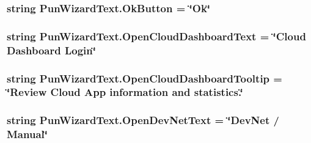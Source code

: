 \subsubsection[{\texorpdfstring{Ok\+Button}{OkButton}}]{\setlength{\rightskip}{0pt plus 5cm}string Pun\+Wizard\+Text.\+Ok\+Button = \char`\"{}Ok\char`\"{}}\hypertarget{class_pun_wizard_text_af648bd493d80786ad6e80e1761197482}{}\label{class_pun_wizard_text_af648bd493d80786ad6e80e1761197482}
\subsubsection[{\texorpdfstring{Open\+Cloud\+Dashboard\+Text}{OpenCloudDashboardText}}]{\setlength{\rightskip}{0pt plus 5cm}string Pun\+Wizard\+Text.\+Open\+Cloud\+Dashboard\+Text = \char`\"{}Cloud Dashboard Login\char`\"{}}\hypertarget{class_pun_wizard_text_a2c646651f0fc0c7f67b446c3c1c4e3d7}{}\label{class_pun_wizard_text_a2c646651f0fc0c7f67b446c3c1c4e3d7}
\subsubsection[{\texorpdfstring{Open\+Cloud\+Dashboard\+Tooltip}{OpenCloudDashboardTooltip}}]{\setlength{\rightskip}{0pt plus 5cm}string Pun\+Wizard\+Text.\+Open\+Cloud\+Dashboard\+Tooltip = \char`\"{}Review Cloud App information and statistics.\char`\"{}}\hypertarget{class_pun_wizard_text_a1b531189b2d2c2fe29b98a4591d5a5c0}{}\label{class_pun_wizard_text_a1b531189b2d2c2fe29b98a4591d5a5c0}
\subsubsection[{\texorpdfstring{Open\+Dev\+Net\+Text}{OpenDevNetText}}]{\setlength{\rightskip}{0pt plus 5cm}string Pun\+Wizard\+Text.\+Open\+Dev\+Net\+Text = \char`\"{}Dev\+Net / Manual\char`\"{}}\hypertarget{class_pun_wizard_text_a3e060bb7abfa48522c8acac07c86789f}{}\label{class_pun_wizard_text_a3e060bb7abfa48522c8acac07c86789f}
